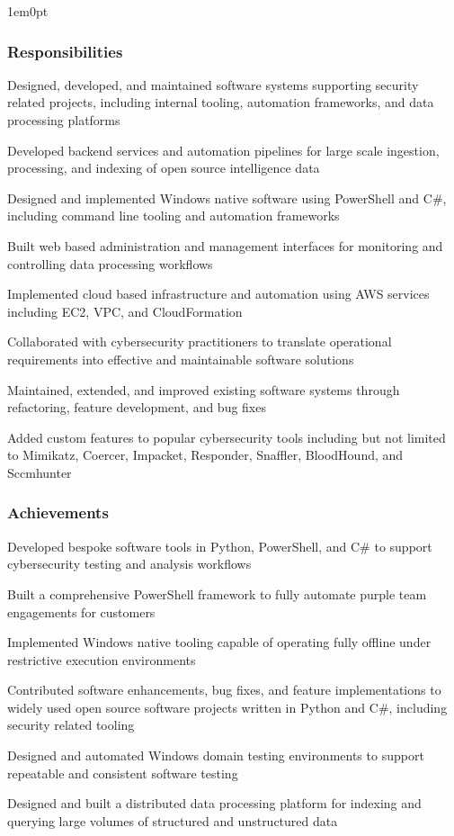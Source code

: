 \documentclass{../styles/cv}
\begin{document}
\begin{adjustwidth}{1em}{0pt}
\subsubsection*{Responsibilities}
\resumesublistbegin
    \item Designed, developed, and maintained software systems supporting security related projects, including internal tooling, automation frameworks, and data processing platforms
    \item Developed backend services and automation pipelines for large scale ingestion, processing, and indexing of open source intelligence data
    \item Designed and implemented Windows native software using PowerShell and C\#, including command line tooling and automation frameworks
    \item Built web based administration and management interfaces for monitoring and controlling data processing workflows
    \item Implemented cloud based infrastructure and automation using AWS services including EC2, VPC, and CloudFormation
    \item Collaborated with cybersecurity practitioners to translate operational requirements into effective and maintainable software solutions
    \item Maintained, extended, and improved existing software systems through refactoring, feature development, and bug fixes
    \item Added custom features to popular cybersecurity tools including but not limited to Mimikatz, Coercer, Impacket, Responder, Snaffler, BloodHound, and Sccmhunter
\resumesublistend

\subsubsection*{Achievements}
\resumesublistbegin
    \item Developed bespoke software tools in Python, PowerShell, and C\# to support cybersecurity testing and analysis workflows
    \item Built a comprehensive PowerShell framework to fully automate purple team engagements for customers
    \item Implemented Windows native tooling capable of operating fully offline under restrictive execution environments
    \item Contributed software enhancements, bug fixes, and feature implementations to widely used open source software projects written in Python and C\#, including security related tooling
    \item Designed and automated Windows domain testing environments to support repeatable and consistent software testing
    \item Designed and built a distributed data processing platform for indexing and querying large volumes of structured and unstructured data
\resumesublistend
\end{adjustwidth}
\end{document}
